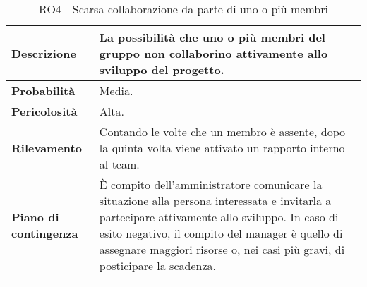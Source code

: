 \begin{longtable}{ | l | p{10cm} | }
	\hline
	\textbf{Descrizione}          & La possibilità che uno o più membri del gruppo non collaborino attivamente allo sviluppo del progetto.                                                                                                                                                                           \\
	\hline
	\textbf{Probabilità}          & Media.                                                                                                                                                                                                                                                                           \\
	\hline
	\textbf{Pericolosità}         & Alta.                                                                                                                                                                                                                                                                            \\
	\hline
	\textbf{Rilevamento}          & Contando le volte che un membro è assente, dopo la quinta volta viene attivato un rapporto interno al team.                                                                                                                                                                      \\
	\hline
	\textbf{Piano di contingenza} & È compito dell'amministratore comunicare la situazione alla persona interessata e invitarla a partecipare attivamente allo sviluppo. In caso di esito negativo, il compito del manager è quello di assegnare maggiori risorse o, nei casi più gravi, di posticipare la scadenza. \\
	\hline
	\caption{RO4 - Scarsa collaborazione da parte di uno o più membri}
	\label{table:4}
\end{longtable}


\newpage


